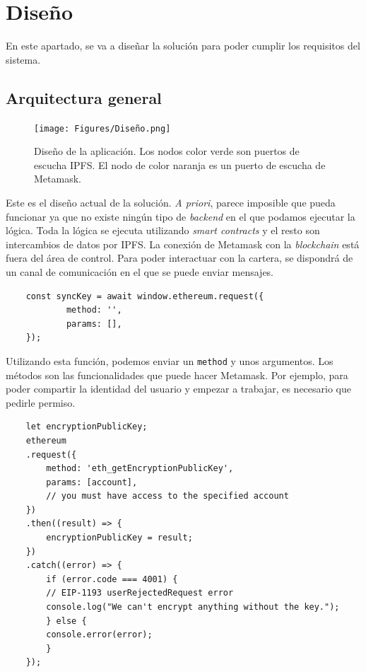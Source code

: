\section{Diseño}
En este apartado, se va a diseñar la solución para poder cumplir los requisitos del sistema.
\subsection{Arquitectura general}
\begin{figure}[h!]
    \centering
    \texttt{[image: Figures/Diseño.png]}
    \caption{Diseño de la aplicación. Los nodos color verde son puertos de escucha IPFS. El nodo de color naranja es un puerto de escucha de Metamask.}
\end{figure}
Este es el diseño actual de la solución. \textit{A priori}, parece imposible que pueda funcionar ya que no existe ningún tipo de \textit{backend} en el que podamos ejecutar la lógica. Toda la lógica se ejecuta utilizando \textit{smart contracts} y el resto son intercambios de datos por IPFS.
La conexión de Metamask con la \textit{blockchain} está fuera del área de control. Para poder interactuar con la cartera, se dispondrá de un canal de comunicación en el que se puede enviar mensajes.
\begin{lstlisting}
    const syncKey = await window.ethereum.request({
			method: '',
			params: [],
    });
\end{lstlisting}
Utilizando esta función, podemos enviar un \verb|method| y unos argumentos. Los métodos son las funcionalidades que puede hacer Metamask.
Por ejemplo, para poder compartir la identidad del usuario y empezar a trabajar, es necesario que pedirle permiso. 
\begin{lstlisting}
    let encryptionPublicKey;
    ethereum
    .request({
        method: 'eth_getEncryptionPublicKey',
        params: [account], 
        // you must have access to the specified account
    })
    .then((result) => {
        encryptionPublicKey = result;
    })
    .catch((error) => {
        if (error.code === 4001) {
        // EIP-1193 userRejectedRequest error
        console.log("We can't encrypt anything without the key.");
        } else {
        console.error(error);
        }
    });
\end{lstlisting}
\cite{web:Metamask_wiki}
